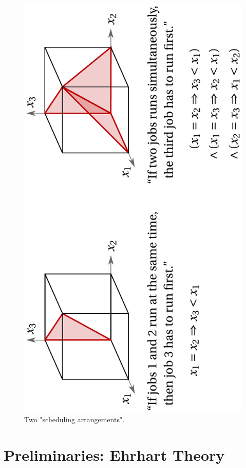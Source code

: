 \documentclass[11pt,letter]{amsart}
\begin{document}
\begin{figure}[h]
\includegraphics[width=13cm]{schedule}
\caption{Two "scheduling arrangements".}
\end{figure}


\section{Preliminaries: Ehrhart Theory}
\end{document}
